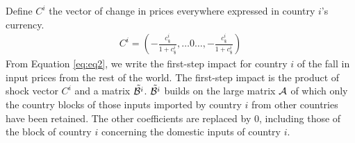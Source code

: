 \documentclass[11pt,a4paper]{paper} %
\begin{document}
%
Define $C^i$ the vector of change in prices everywhere expressed in country $i$'s currency.\\
\begin{eqnarray*}
C^i = \left(-\frac{c_\$^i}{1+c_\$^i},\ldots0\ldots,-\frac{c_\$^i}{1+c_\$^i} \right)
\end{eqnarray*}
From Equation \ref{eq:eq2}, we write the first-step impact for country $i$ of the fall in input prices from the rest of the world. 
The first-step impact is the product of shock vector $C^i$ and a matrix ${\tilde{{\cal B}^i}}$. ${\tilde{{\cal B}^i}}$ builds on the large matrix ${\cal A}$ of which only the country blocks of those inputs imported by country $i$ from other countries have been retained. 
The other coefficients are replaced by 0, including those of the block of country $i$ concerning the domestic inputs of country $i$. \\
\end{document}
